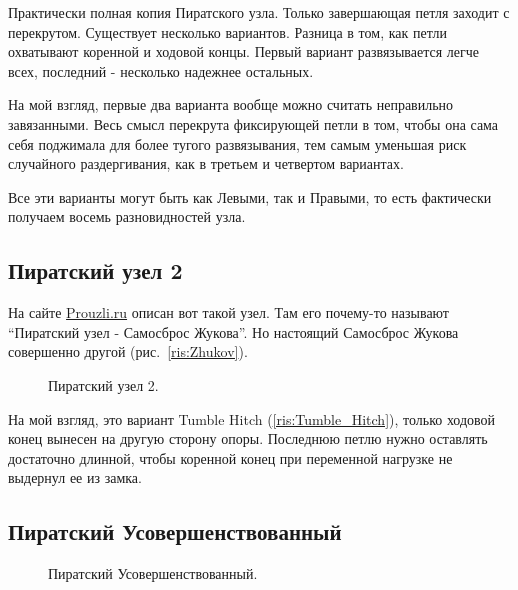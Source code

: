 Практически полная копия Пиратского узла. Только завершающая петля заходит с перекрутом. Существует несколько вариантов. Разница в том, как петли охватывают коренной и ходовой концы. Первый вариант развязывается легче всех, последний - несколько надежнее остальных.

На мой взгляд, первые два варианта вообще можно считать неправильно завязанными. Весь смысл перекрута фиксирующей петли в том, чтобы она сама себя поджимала для более тугого развязывания, тем самым уменьшая риск случайного раздергивания, как в третьем и четвертом вариантах.

Все эти варианты могут быть как Левыми, так и Правыми, то есть фактически получаем восемь разновидностей узла.

\subsection{Пиратский узел 2}

На сайте \href{http://prouzli.ru}{Prouzli.ru} описан вот такой узел. Там его почему-то называют \enquote{Пиратский узел - Самосброс Жукова}. Но настоящий Самосброс Жукова совершенно другой (рис.~\ref{ris:Zhukov}).

\begin{figure}[H]\centering
	\subfloat[Завязывание]{\label{ris:Piratsky_2_1}
	\tcbox[enhanced jigsaw,colframe=black,opacityframe=0.5,opacityback=0.5,height=6.5cm]
		{\centering
			}
		}
\hfil
	\subfloat[Результат]{\label{ris:Piratsky_2_2}
	\tcbox[enhanced jigsaw,colframe=black,opacityframe=0.5,opacityback=0.5,height=6.5cm]
		{\centering
			}
		}
	\caption{Пиратский узел 2.}\label{ris:Piratsky_2}
\end{figure}

На мой взгляд, это вариант Tumble Hitch (\ref{ris:Tumble_Hitch}), только ходовой конец вынесен на другую сторону опоры. Последнюю петлю нужно оставлять достаточно длинной, чтобы коренной конец при переменной нагрузке не выдернул ее из замка.

\subsection{Пиратский Усовершенствованный}

\begin{figure}[H]\centering
	\subfloat[Завязывание]{\label{ris:Piratsky_3_1}
	\tcbox[enhanced jigsaw,colframe=black,opacityframe=0.5,opacityback=0.5,height=6cm]
		{\centering
			}
		}
\hfil
	\subfloat[Результат]{\label{ris:Piratsky_3_2}
	\tcbox[enhanced jigsaw,colframe=black,opacityframe=0.5,opacityback=0.5,height=6cm]
		{\centering
			}
		}
	\caption{Пиратский Усовершенствованный.}\label{ris:Piratsky_3}
\end{figure}

